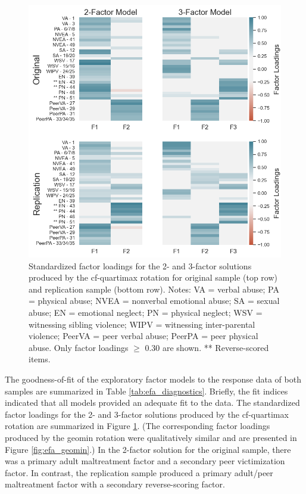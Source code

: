 \documentclass[letterpaper,man,natbib,floatsintext,longtable]{apa6}
\begin{document}
\begin{figure}[t!]
    \centering
    \includegraphics[width=1\textwidth,center]{figures/fig04.png}
    \caption{\normalfont Standardized factor loadings for the 2- and 3-factor solutions produced by the cf-quartimax rotation for original sample (top row) and replication sample (bottom row). Notes: VA = verbal abuse; PA = physical abuse; NVEA = nonverbal emotional abuse; SA = sexual abuse; EN = emotional neglect; PN = physical neglect; WSV = witnessing sibling violence; WIPV = witnessing inter-parental violence; PeerVA = peer verbal abuse; PeerPA = peer physical abuse. Only factor loadings $\geq$ 0.30 are shown. ** Reverse-scored items.}
    \label{fig:efa_cf}
\end{figure}

The goodness-of-fit of the exploratory factor models to the response data of both samples are summarized in Table \ref{tab:efa_diagnostics}. Briefly, the fit indices indicated that all models provided an adequate fit to the data. The standardized factor loadings for the 2- and 3-factor solutions produced by the cf-quartimax rotation are summarized in Figure \ref{fig:efa_cf}. (The corresponding factor loadings produced by the geomin rotation were qualitatively similar and are presented in Figure \ref{fig:efa_geomin}.) In the 2-factor solution for the original sample, there was a primary adult maltreatment factor and a secondary peer victimization factor. In contrast, the replication sample produced a primary adult/peer maltreatment factor with a secondary reverse-scoring factor. 
\end{document}
